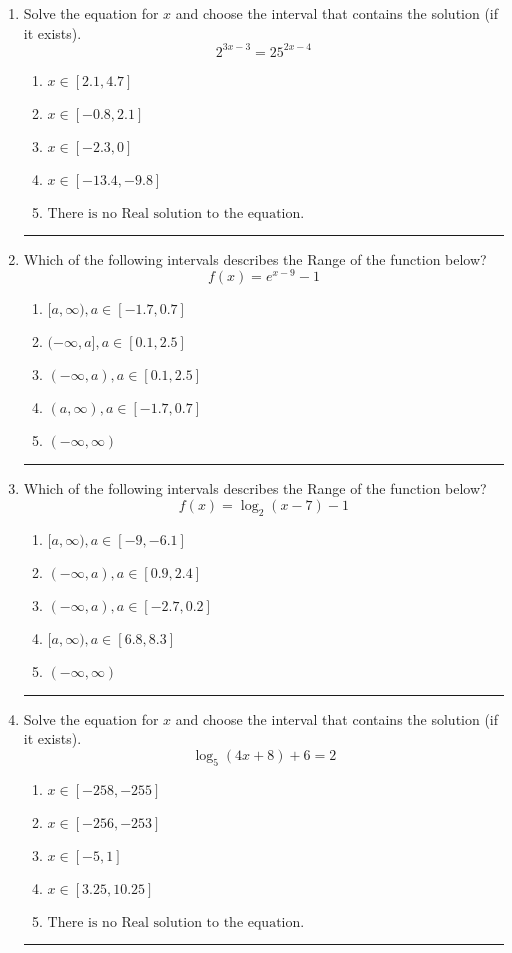 \documentclass[14pt]{extbook}
\newcommand{\litem}[1]{\item#1\hspace*{-1cm}\rule{\textwidth}{0.4pt}}
\begin{document}
\begin{enumerate}
{\begin{enumerate}[label=\Alph*.]
\end{enumerate} }
\litem{
Solve the equation for $x$ and choose the interval that contains the solution (if it exists).\[ 2^{3x-3} = 25^{2x-4} \]\begin{enumerate}[label=\Alph*.]
\item \( x \in [2.1, 4.7] \)
\item \( x \in [-0.8, 2.1] \)
\item \( x \in [-2.3, 0] \)
\item \( x \in [-13.4, -9.8] \)
\item \( \text{There is no Real solution to the equation.} \)

\end{enumerate} }
\litem{
Which of the following intervals describes the Range of the function below?\[ f(x) = e^{x-9}-1 \]\begin{enumerate}[label=\Alph*.]
\item \( [a, \infty), a \in [-1.7, 0.7] \)
\item \( (-\infty, a], a \in [0.1, 2.5] \)
\item \( (-\infty, a), a \in [0.1, 2.5] \)
\item \( (a, \infty), a \in [-1.7, 0.7] \)
\item \( (-\infty, \infty) \)

\end{enumerate} }
\litem{
Which of the following intervals describes the Range of the function below?\[ f(x) = \log_2{(x-7)}-1 \]\begin{enumerate}[label=\Alph*.]
\item \( [a, \infty), a \in [-9, -6.1] \)
\item \( (-\infty, a), a \in [0.9, 2.4] \)
\item \( (-\infty, a), a \in [-2.7, 0.2] \)
\item \( [a, \infty), a \in [6.8, 8.3] \)
\item \( (-\infty, \infty) \)

\end{enumerate} }
\litem{
Solve the equation for $x$ and choose the interval that contains the solution (if it exists).\[ \log_{5}{(4x+8)}+6 = 2 \]\begin{enumerate}[label=\Alph*.]
\item \( x \in [-258, -255] \)
\item \( x \in [-256, -253] \)
\item \( x \in [-5, 1] \)
\item \( x \in [3.25, 10.25] \)
\item \( \text{There is no Real solution to the equation.} \)


\end{enumerate}}
\end{enumerate}
\end{document}
